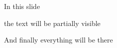 \begin{frame}
    In this slide \pause
    
    the text will be partially visible \pause
    
    And finally everything will be there
    \end{frame}